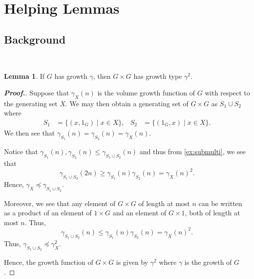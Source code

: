 \documentclass[11pt,a4paper,reqno]{amsart}
\theoremstyle{plain}
\theoremstyle{definition}
\newtheorem{lemma}[theorem]{Lemma}
\theoremstyle{definition}
\newenvironment{myproof}{\begin{proof}[\normalfont\bfseries Proof.]}{\end{proof}}
\renewcommand\leq\leqslant
\renewcommand\geq\geqslant
\begin{document}

\section{Helping Lemmas}

\subsection{Background} ~

\begin{lemma}
  If $G$ has growth $\gamma$, then $G\times G$ has growth type $\gamma^2$.
\end{lemma}

\begin{myproof}
Suppose that $\gamma_X(n)$ is the volume growth function of $G$ with respect to the generating set $X$.
We may then obtain a generating set of $G\times G$ as $S_1\cup S_2$ where
\begin{align*}
  S_1 &= \{ (x,1_G) \mid x\in X\}, &
  S_2 &= \{ (1_G,x) \mid x\in X\}.
\end{align*}
We then see that
$
  \gamma_{S_1}(n) = \gamma_{S_2}(n) = \gamma_X(n).
$

Notice that $\gamma_{S_1}(n), \gamma_{S_2}(n) \leq \gamma_{S_1\cup S_2}(n)$ and thus from \cref{ex:submulti}, we see that
\[
  \gamma_{S_1 \cup S_2}(2n) \geq \gamma_{S_1}(n) \gamma_{S_2}(n)= \gamma_{X}(n)^2.
\]
Hence, $\gamma_X \preccurlyeq \gamma_{S_1\cup S_2}$.

Moreover, we see that any element of $G\times G$ of length at most $n$ can be written as a product of an element of ${1}\times G$ and an element of $G\times {1}$, both of length at most $n$.
Thus,
\[
  \gamma_{S_1\cup S_2}(n) \leq \gamma_{S_1}(n) \gamma_{S_2}(n) = \gamma_X(n)^2.
\]
Thus, $\gamma_{S_1\cup S_2} \preccurlyeq \gamma_X^2$.

Hence, the growth function of $G\times G$ is given by $\gamma^2$ where $\gamma$ is the growth of $G$.
\end{myproof}
\end{document}
